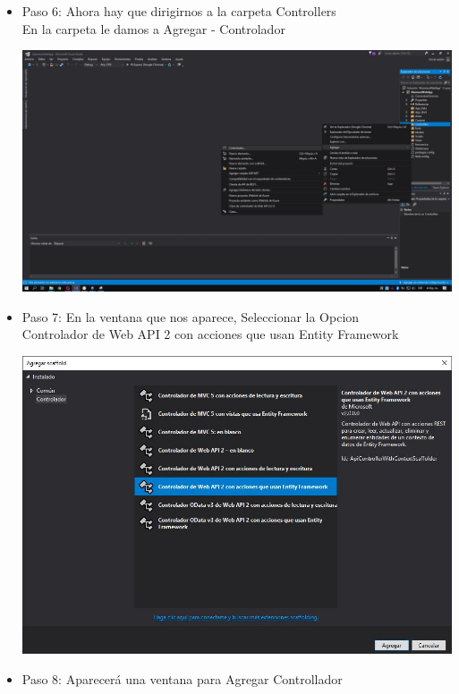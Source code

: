 \begin{itemize}
\begin{center}
	\end{center}
	\newpage
	\item Paso 6: Ahora hay que dirigirnos a la carpeta Controllers\\ 
	En la carpeta le damos a Agregar - Controlador\\
	\begin{center}
		\includegraphics[width=15cm]{./Imagenes/Captura5}
	\end{center}
	\item Paso 7: En la ventana que nos aparece, Seleccionar la Opcion\\
	Controlador de Web API 2 con acciones que usan Entity Framework\\
	\begin{center}
		\includegraphics[width=15cm]{./Imagenes/Captura7}
	\end{center}
	\item Paso 8: Aparecerá una ventana para Agregar Controllador\\

\end{itemize}

